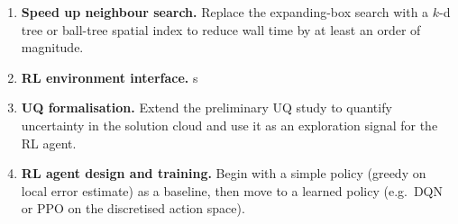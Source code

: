 \documentclass[12pt, a4paper, twoside]{report}
\theoremstyle{plain}
\theoremstyle{definition}
\begin{document}
\begin{enumerate}
    \item \textbf{Speed up neighbour search.}
    Replace the expanding-box search with a $k$-d tree or
    ball-tree spatial index to reduce wall time by at least an
    order of magnitude.
 

    \item \textbf{RL environment interface.}
  s

    \item \textbf{UQ formalisation.}
    Extend the preliminary UQ study to quantify uncertainty in the
    solution cloud and use it as an exploration signal for the
    RL agent.

    \item \textbf{RL agent design and training.}
    Begin with a simple policy (greedy on local error estimate)
    as a baseline, then move to a learned policy (e.g.\ DQN or
    PPO on the discretised action space).
\end{enumerate}


\end{document}
